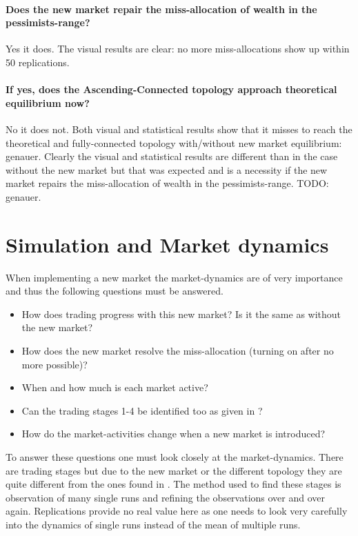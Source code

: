 \documentclass[Bachelorarbeit.tex]{subfiles}
\begin{document}
\paragraph{Does the new market repair the miss-allocation of wealth in the pessimists-range?}
Yes it does. The visual results are clear: no more miss-allocations show up within 50 replications.

\paragraph{If yes, does the Ascending-Connected topology approach theoretical equilibrium now?}
No it does not. Both visual and statistical results show that it misses to reach the theoretical and fully-connected topology with/without new market equilibrium: genauer.
Clearly the visual and statistical results are different than in the case without the new market but that was expected and is a necessity if the new market repairs the miss-allocation of wealth in the pessimists-range. TODO: genauer.


\section{Simulation and Market dynamics}
When implementing a new market the market-dynamics are of very importance and thus the following questions must be answered.

\begin{itemize}
\item How does trading progress with this new market? Is it the same as without the new market?
\item How does the new market resolve the miss-allocation (turning on after no more possible)?
\item When and how much is each market active? 
\item Can the trading stages 1-4 be identified too as given in \cite{Breuer_2015}?
\item How do the market-activities change when a new market is introduced?
\end{itemize}

To answer these questions one must look closely at the market-dynamics.
There are trading stages but due to the new market or the different topology they are quite different from the ones found in \cite{Breuer_2015}. The method used to find these stages is observation of many single runs and refining the observations over and over again. Replications provide no real value here as one needs to look very carefully into the dynamics of single runs instead of the mean of multiple runs.
\end{document}
